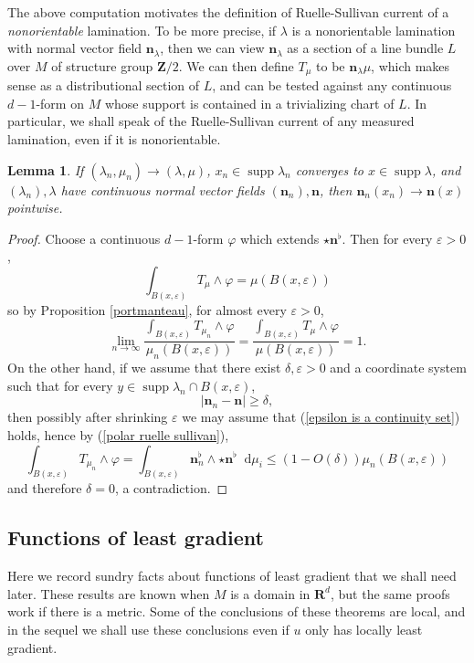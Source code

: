 \documentclass[reqno,11pt]{amsart}
\newcommand{\ZZ}{\mathbf{Z}}
\newcommand{\RR}{\mathbf{R}}
\newcommand*\dif{\mathop{}\!\mathrm{d}}
\DeclareMathOperator{\supp}{supp}
\newcommand{\normal}{\mathbf n}
\newtheorem{lemma}[theorem]{Lemma}
\theoremstyle{definition}
\numberwithin{equation}{section}
\begin{document}
The above computation motivates the definition of Ruelle-Sullivan current of a \emph{nonorientable} lamination.
To be more precise, if $\lambda$ is a nonorientable lamination with normal vector field $\normal_\lambda$, then we can view $\normal_\lambda$ as a section of a line bundle $L$ over $M$ of structure group $\ZZ/2$.
We can then define $T_\mu$ to be $\normal_\lambda \mu$, which makes sense as a distributional section of $L$, and can be tested against any continuous $d-1$-form on $M$ whose support is contained in a trivializing chart of $L$.
In particular, we shall speak of the Ruelle-Sullivan current of any measured lamination, even if it is nonorientable.

\begin{lemma}\label{convergence of normals}
If $(\lambda_n, \mu_n) \to (\lambda, \mu)$, $x_n \in \supp \lambda_n$ converges to $x \in \supp \lambda$, and $(\lambda_n), \lambda$ have continuous normal vector fields $(\normal_n), \normal$, then $\normal_n(x_n) \to \normal(x)$ pointwise.
\end{lemma}
\begin{proof}
	Choose a continuous $d-1$-form $\varphi$ which extends $\star \normal^\flat$.
	Then for every $\varepsilon > 0$,
	$$\int_{B(x, \varepsilon)} T_\mu \wedge \varphi = \mu(B(x, \varepsilon))$$
	so by Proposition \ref{portmanteau}, for almost every $\varepsilon > 0$,
	\begin{equation}\label{epsilon is a continuity set}
		\lim_{n \to \infty} \frac{\int_{B(x, \varepsilon)} T_{\mu_n} \wedge \varphi}{\mu_n(B(x, \varepsilon))} = \frac{\int_{B(x, \varepsilon)} T_\mu \wedge \varphi}{\mu(B(x, \varepsilon))} = 1.
	\end{equation}
	On the other hand, if we assume that there exist $\delta, \varepsilon > 0$ and a coordinate system such that for every $y \in \supp \lambda_n \cap B(x, \varepsilon)$,
	$$|\normal_n - \normal| \geq \delta,$$
	then possibly after shrinking $\varepsilon$ we may assume that (\ref{epsilon is a continuity set}) holds, hence by (\ref{polar ruelle sullivan}),
	$$\int_{B(x, \varepsilon)} T_{\mu_n} \wedge \varphi = \int_{B(x, \varepsilon)} \normal_n^\flat \wedge \star \normal^\flat \dif \mu_i \leq (1 - O(\delta)) \mu_n(B(x, \varepsilon))$$
	and therefore $\delta = 0$, a contradiction.
\end{proof}

\subsection{Functions of least gradient}
Here we record sundry facts about functions of least gradient that we shall need later.
These results are known when $M$ is a domain in $\RR^d$, but the same proofs work if there is a metric.
Some of the conclusions of these theorems are local, and in the sequel we shall use these conclusions even if $u$ only has locally least gradient.
\end{document}
